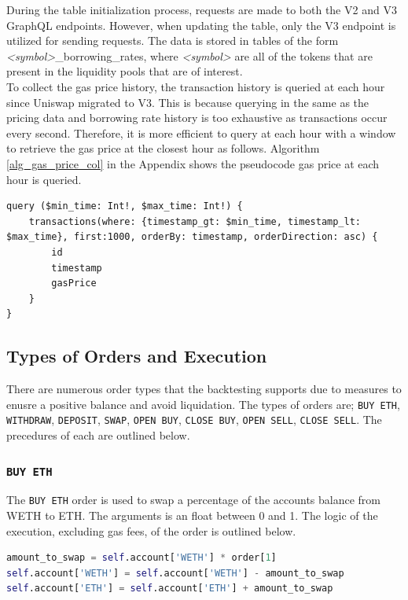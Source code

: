 During the table initialization process, requests are made to both the V2 and V3 GraphQL endpoints. However, when updating the table, only the V3 endpoint is utilized for sending requests. The data is stored in tables of the form \textit{<symbol>}\_borrowing\_rates, where \textit{<symbol>} are all of the tokens that are present in the liquidity pools that are of interest.
\\[3mm]
To collect the gas price history, the transaction history is queried at each hour since Uniswap migrated to V3. This is because querying in the same as the pricing data and borrowing rate history is too exhaustive as transactions occur every second. Therefore, it is more efficient to query at each hour with a window to retrieve the gas price at the closest hour as follows. Algorithm \ref{alg_gas_price_col} in the Appendix shows the pseudocode gas price at each hour is queried. 
\vspace{5mm}
\begin{lstlisting}
query ($min_time: Int!, $max_time: Int!) {
    transactions(where: {timestamp_gt: $min_time, timestamp_lt: $max_time}, first:1000, orderBy: timestamp, orderDirection: asc) {
        id
        timestamp
        gasPrice
    }
}
\end{lstlisting}
\subsection{Types of Orders and Execution}
There are numerous order types that the backtesting supports due to measures to enusre a positive balance and avoid liquidation. The types of orders are; \texttt{BUY\ ETH}, \texttt{WITHDRAW}, \texttt{DEPOSIT}, \texttt{SWAP}, \texttt{OPEN\ BUY}, \texttt{CLOSE\ BUY}, \texttt{OPEN\ SELL}, \texttt{CLOSE\ SELL}. The precedures of each are outlined below.

\subsubsection{\texttt{BUY\ ETH}}
The \texttt{BUY\ ETH} order is used to swap a percentage of the accounts balance from WETH to ETH. The arguments is an float between 0 and 1. The logic of the execution, excluding gas fees, of the order is outlined below.
\vspace{5mm}
\begin{lstlisting}[language=Python]
amount_to_swap = self.account['WETH'] * order[1]
self.account['WETH'] = self.account['WETH'] - amount_to_swap
self.account['ETH'] = self.account['ETH'] + amount_to_swap
\end{lstlisting}

